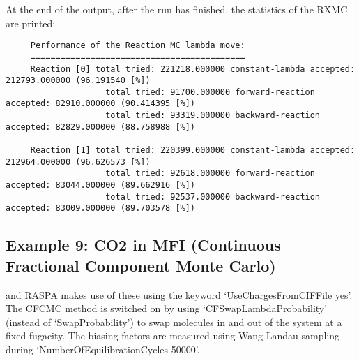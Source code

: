 At the end of the output, after the run has finished, the statistics of the RXMC are printed:
\begin{tiny}
\begin{verbatim}
     Performance of the Reaction MC lambda move:
     ===========================================
     Reaction [0] total tried: 221218.000000 constant-lambda accepted: 212793.000000 (96.191540 [%])
                    total tried: 91700.000000 forward-reaction accepted: 82910.000000 (90.414395 [%])
                    total tried: 93319.000000 backward-reaction accepted: 82829.000000 (88.758988 [%])

     Reaction [1] total tried: 220399.000000 constant-lambda accepted: 212964.000000 (96.626573 [%])
                    total tried: 92618.000000 forward-reaction accepted: 83044.000000 (89.662916 [%])
                    total tried: 92537.000000 backward-reaction accepted: 83009.000000 (89.703578 [%])
\end{verbatim}
\end{tiny}

\subsection*{Example 9: CO2 in MFI (Continuous Fractional Component Monte Carlo)}

and RASPA makes use of these using the keyword `UseChargesFromCIFFile yes'.
The CFCMC method is switched on by using `CFSwapLambdaProbability' (instead of `SwapProbability') to swap molecules in and out of the system at a fixed fugacity.
The biasing factors are measured using Wang-Landau sampling during `NumberOfEquilibrationCycles 50000'.

